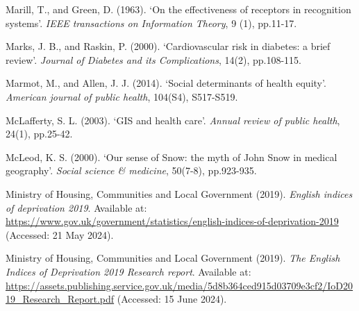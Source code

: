 \begin{Reference}
\begin{flushleft}
Marill, T., and Green, D. (1963). `On the effectiveness of receptors in recognition systems'. \textit{IEEE transactions on Information Theory}, 9 (1), pp.11-17.
\end{flushleft}
\vspace{2pt}


\begin{flushleft}
Marks, J. B., and Raskin, P. (2000). `Cardiovascular risk in diabetes: a brief review'. \textit{Journal of Diabetes and its Complications}, 14(2), pp.108-115.
\end{flushleft}
\vspace{2pt}


\begin{flushleft}
Marmot, M., and Allen, J. J. (2014). `Social determinants of health equity'. \textit{American journal of public health}, 104(S4), S517-S519.
\end{flushleft}
\vspace{2pt}


\begin{flushleft}
McLafferty, S. L. (2003). `GIS and health care'. \textit{Annual review of public health}, 24(1), pp.25-42.
\end{flushleft}
\vspace{2pt}


\begin{flushleft}
McLeod, K. S. (2000). `Our sense of Snow: the myth of John Snow in medical geography'. \textit{Social science \& medicine}, 50(7-8), pp.923-935.
\end{flushleft}
\vspace{2pt}


\begin{flushleft}
Ministry of Housing, Communities and Local Government (2019). \textit{English indices of deprivation 2019}. Available at: \url{https://www.gov.uk/government/statistics/english-indices-of-deprivation-2019} (Accessed: 21 May 2024).
\end{flushleft}
\vspace{2pt}


\begin{flushleft}
Ministry of Housing, Communities and Local Government (2019). \textit{The English Indices of Deprivation 2019 Research report}. Available at: \url{https://assets.publishing.service.gov.uk/media/5d8b364ced915d03709e3cf2/IoD2019_Research_Report.pdf} (Accessed: 15 June 2024).
\end{flushleft}
\vspace{2pt}



\end{Reference}
